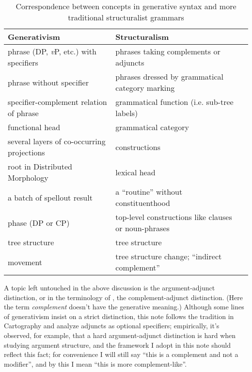 \documentclass[UTF8, a4paper, oneside, scheme=plain, 12pt]{ctexbook}
\newcommand*{\term}[1]{\emph{#1}}
\newcommand{\vP}{\textit{v}P}
\begin{document}
{\begin{table}[H]
    \caption{Correspondence between concepts in generative syntax and more traditional structuralist grammars}
    \label{tbl:theory.cgel}
    \centering
    \small
    \begin{tabular}{@{}lll@{}}
    \toprule
    Generativism                               & Structuralism                                          \\ \midrule
    phrase (DP, \vP, etc.) with specifiers     & phrases taking complements or adjuncts                        \\
    phrase without specifier                   & phrases dressed by grammatical category marking             \\
    specifier-complement relation of phrase    & grammatical function (i.e. sub-tree labels)  \\
    functional head                            & grammatical category                     \\
    several layers of co-occurring projections & constructions                                 \\
    root in Distributed Morphology             & lexical head                                          \\
    a batch of spellout result                 & a ``routine'' without constituenthood    \\
    phase (DP or CP)                           & top-level constructions like clauses or noun-phrases                          \\
    tree structure                             & tree structure  \\
    movement                                   & tree structure change; ``indirect complement''                            \\ \bottomrule
    \end{tabular}
\end{table}

A topic left untouched in the above discussion 
is the argument-adjunct distinction, 
or in the terminology of \citet{cgel}, 
the complement-adjunct distinction.
(Here the term \term{complement} doesn't have the generative meaning.)
Although some lines of generativism insist on a strict distinction, 
this note follows the tradition in Cartography 
and analyze adjuncts as optional specifiers;
empirically, it's observed, 
for example, that a hard argument-adjunct distinction is hard 
when studying argument structure, 
and the framework I adopt in this note should reflect this fact; 
for convenience I will still say ``this is a complement and not a modifier'',
and by this I mean ``this is more complement-like''. 

}
\end{document}
